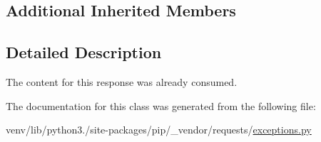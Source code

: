 \subsection*{Additional Inherited Members}


\subsection{Detailed Description}
\begin{DoxyVerb}The content for this response was already consumed.\end{DoxyVerb}
 

The documentation for this class was generated from the following file\+:\begin{DoxyCompactItemize}
\item 
venv/lib/python3./site-\/packages/pip/\+\_\+vendor/requests/\hyperlink{pip_2__vendor_2requests_2exceptions_8py}{exceptions.\+py}\end{DoxyCompactItemize}
